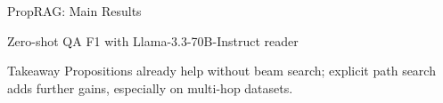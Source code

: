 \begin{frame}{PropRAG: Main Results}
\scriptsize
\begin{block}{Zero-shot QA F1 with Llama-3.3-70B-Instruct reader}
\centering
{}
\end{block}
\begin{block}{Takeaway}
Propositions already help without beam search; explicit path search adds further gains, especially on multi-hop datasets.
\end{block}
\end{frame}
